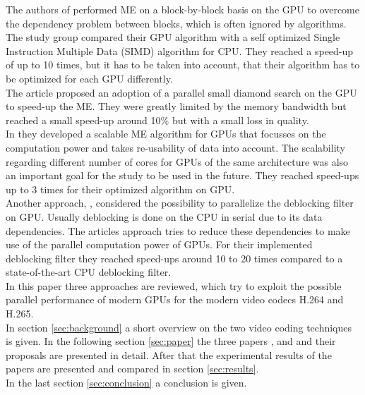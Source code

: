 The authors of \cite{ME2} performed ME on a block-by-block basis on the GPU to overcome the dependency problem between blocks, which is often ignored by algorithms. The study group compared their GPU algorithm with a self optimized Single Instruction Multiple Data (SIMD) algorithm for CPU. They reached a speed-up of up to 10 times, but it has to be taken into account, that their algorithm has to be optimized for each GPU differently.\\

The article \cite{ME3} proposed an adoption of a parallel small diamond search on the GPU to speed-up the ME. They were greatly limited by the memory bandwidth but reached a small speed-up around 10\% but with a small loss in quality.\\

In \cite{ME4} they developed a scalable ME algorithm for GPUs that focusses on the computation power and takes re-usability of data into account. The scalability regarding different number of cores for  GPUs of the same architecture was also an important goal for the study to be used in the future. They reached speed-ups up to 3 times for their optimized algorithm on GPU.\\

Another approach, \cite{deblock1}, considered the possibility to parallelize the deblocking filter on GPU. Usually deblocking is done on the CPU in serial due to its data dependencies. The articles approach tries to reduce these dependencies to make use of the parallel computation power of GPUs. For their implemented deblocking filter they reached speed-ups around 10 to 20 times compared to a state-of-the-art CPU deblocking filter.\\

In this paper three approaches are reviewed, which try to exploit the possible parallel performance of modern GPUs for the modern video codecs H.264 and H.265. \\
In section \ref{sec:background} a short overview on the two video coding techniques is given. In the following section \ref{sec:paper} the three papers \cite{Paper1}, \cite{Paper2} and \cite{Paper3} and their proposals are presented in detail. After that the experimental results of the papers are presented and compared in section \ref{sec:results}.\\
In the last section \ref{sec:conclusion} a conclusion is given.